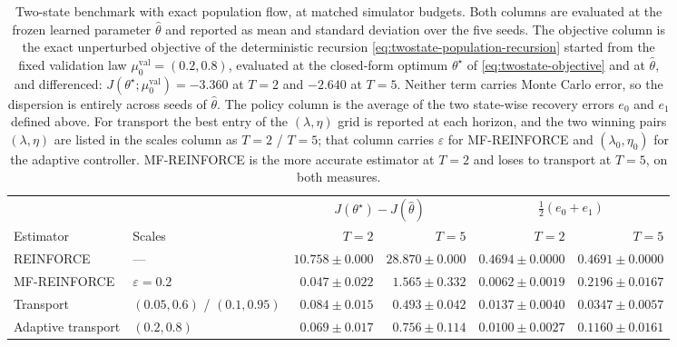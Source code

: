 \begin{table}[H]
\centering
\small
\begin{tabular}{llrrrr}
\toprule
& & \multicolumn{2}{c}{$J(\theta^\star)-J(\widehat\theta)$} & \multicolumn{2}{c}{$\tfrac12(e_0+e_1)$} \\
\cmidrule(lr){3-4}\cmidrule(lr){5-6}
Estimator & Scales & $T=2$ & $T=5$ & $T=2$ & $T=5$ \\
\midrule
REINFORCE & --- & $10.758\pm0.000$ & $28.870\pm0.000$ & $0.4694\pm0.0000$ & $0.4691\pm0.0000$ \\
MF-REINFORCE & {\footnotesize $\varepsilon=0.2$} & $0.047\pm0.022$ & $1.565\pm0.332$ & $0.0062\pm0.0019$ & $0.2196\pm0.0167$ \\
Transport & {\footnotesize $(0.05,0.6)$ / $(0.1,0.95)$} & $0.084\pm0.015$ & $0.493\pm0.042$ & $0.0137\pm0.0040$ & $0.0347\pm0.0057$ \\
Adaptive transport & {\footnotesize $(0.2,0.8)$} & $0.069\pm0.017$ & $0.756\pm0.114$ & $0.0100\pm0.0027$ & $0.1160\pm0.0161$ \\
\bottomrule
\end{tabular}
\caption{Two-state benchmark with exact population flow, at matched simulator budgets. Both columns are evaluated at the frozen learned parameter $\widehat\theta$ and reported as mean and standard deviation over the five seeds. The objective column is the exact unperturbed objective of the deterministic recursion \eqref{eq:twostate-population-recursion} started from the fixed validation law $\mu_0^{\mathrm{val}}=(0.2,0.8)$, evaluated at the closed-form optimum $\theta^\star$ of \eqref{eq:twostate-objective} and at $\widehat\theta$, and differenced: $J(\theta^\star;\mu_0^{\mathrm{val}})=-3.360$ at $T=2$ and $-2.640$ at $T=5$. Neither term carries Monte Carlo error, so the dispersion is entirely across seeds of $\widehat\theta$. The policy column is the average of the two state-wise recovery errors $e_0$ and $e_1$ defined above. For transport the best entry of the $(\lambda,\eta)$ grid is reported at each horizon, and the two winning pairs $(\lambda,\eta)$ are listed in the scales column as $T=2$ / $T=5$; that column carries $\varepsilon$ for MF-REINFORCE and $(\lambda_0,\eta_0)$ for the adaptive controller. MF-REINFORCE is the more accurate estimator at $T=2$ and loses to transport at $T=5$, on both measures.}
\label{tab:twostate-horizon}
\end{table}
